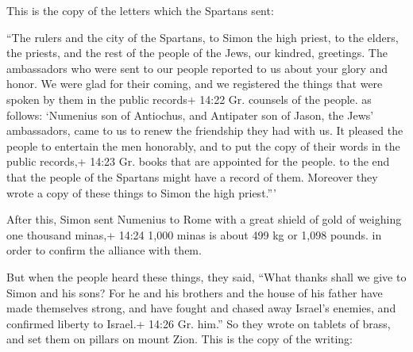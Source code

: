  This is the copy of the letters which the Spartans sent:

``The rulers and the city of the Spartans, to Simon the high priest, to
the elders, the priests, and the rest of the people of the Jews, our
kindred, greetings.  The ambassadors who were sent to our
people reported to us about your glory and honor. We were glad for their
coming,  and we registered the things that were spoken by
them in the public records+ 14:22 Gr. counsels of the people. as
follows: `Numenius son of Antiochus, and Antipater son of Jason, the
Jews' ambassadors, came to us to renew the friendship they had with us.
 It pleased the people to entertain the men honorably, and
to put the copy of their words in the public records,+ 14:23 Gr. books
that are appointed for the people. to the end that the people of the
Spartans might have a record of them. Moreover they wrote a copy of
these things to Simon the high priest.'''

 After this, Simon sent Numenius to Rome with a great
shield of gold of weighing one thousand minas,+ 14:24 1,000 minas is
about 499 kg or 1,098 pounds. in order to confirm the alliance with
them.

 But when the people heard these things, they said, ``What
thanks shall we give to Simon and his sons?  For he and his
brothers and the house of his father have made themselves strong, and
have fought and chased away Israel's enemies, and confirmed liberty to
Israel.+ 14:26 Gr. him.''  So they wrote on tablets of
brass, and set them on pillars on mount Zion. This is the copy of the
writing:

